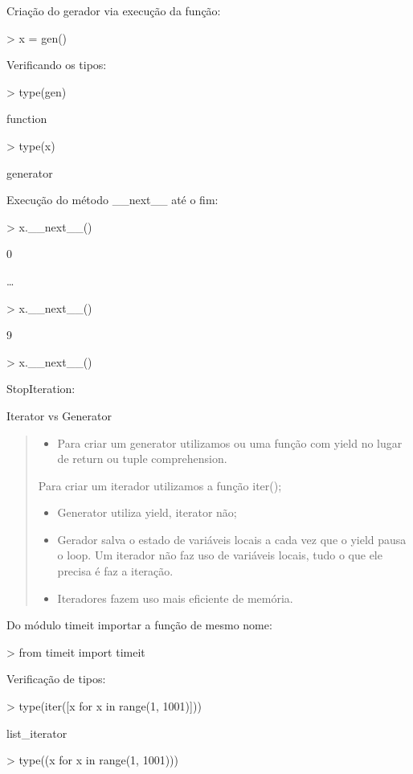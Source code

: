\documentclass[letterpaper,10pt,brazil]{sphinxmanual}
\begin{document}
Criação do gerador via execução da função:

\textgreater{} x = gen()

Verificando os tipos:

\textgreater{} type(gen)

function

\textgreater{} type(x)

generator

Execução do método \_\_next\_\_ até o fim:

\textgreater{} x.\_\_next\_\_()

0

…

\textgreater{} x.\_\_next\_\_()

9

\textgreater{} x.\_\_next\_\_()

StopIteration:

Iterator vs Generator
\begin{quote}
\begin{itemize}
\item {} 
Para criar um generator utilizamos ou uma função com yield no lugar de return ou tuple comprehension.

\end{itemize}

Para criar um iterador utilizamos a função iter();
\begin{itemize}
\item {} 
Generator utiliza yield, iterator não;

\item {} 
Gerador salva o estado de variáveis locais a cada vez que o yield pausa o loop. Um iterador não faz uso de variáveis locais, tudo o que ele precisa é faz a iteração.

\item {} 
Iteradores fazem uso mais eficiente de memória.

\end{itemize}
\end{quote}

Do módulo timeit importar a função de mesmo nome:

\textgreater{} from timeit import timeit

Verificação de tipos:

\textgreater{} type(iter({[}x for x in range(1, 1001){]}))

list\_iterator

\textgreater{} type((x for x in range(1, 1001)))
\end{document}
